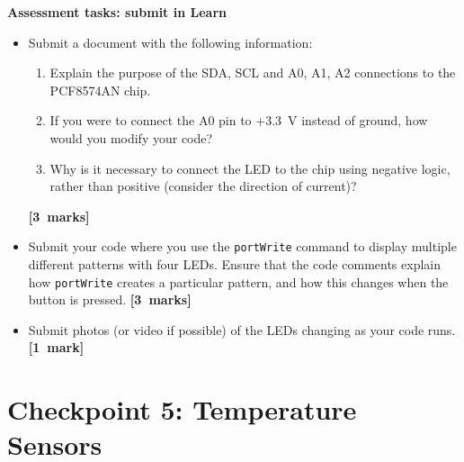 \newpage
{\bf Assessment tasks: submit in Learn}

\begin{itemize}

\item Submit a document with the following information:
\begin{enumerate}
\item Explain the purpose of the SDA, SCL and A0, A1, A2 connections to the PCF8574AN chip.
\item If you were to connect the A0 pin to +3.3~V instead of ground, how would you modify your code?
\item Why is it necessary to connect the LED to the chip using negative logic, rather than positive (consider the direction of current)?
\end{enumerate}
\hfill {\bf[3~marks]}

\item Submit your code where you use the \texttt{portWrite} command to display multiple different patterns with four LEDs.
Ensure that the code comments explain how \texttt{portWrite} creates a particular pattern, and how this changes when the button is pressed.
\hfill {\bf[3~marks]}

\item Submit photos (or video if possible) of the LEDs changing as your code runs.
\hfill {\bf[1~mark]}

\end{itemize}


\newpage
\section{Checkpoint 5: Temperature Sensors}

